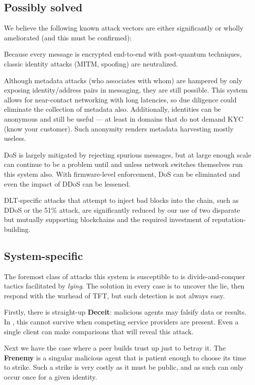 \subsection{Possibly solved}\label{subsec:possibly-solved}

We believe the following known attack vectors are either significantly or wholly ameliorated (and this must be confirmed):

Because every message is encrypted end-to-end with post-quantum techniques, classic identity attacks (MITM, spoofing) are neutralized.

Although metadata attacks (who associates with whom) are hampered by only exposing identity/address pairs in messaging, they are still possible.
This system allows for near-contact networking with long latencies, so due diligence could eliminate the collection of metadata also.
Additionally, identities can be anonymous and still be useful --- at least in domains that do not demand KYC (know your customer).
Such anonymity renders metadata harvesting mostly useless.

DoS is largely mitigated by rejecting spurious messages, but at large enough scale can continue to be a problem until and unless network switches themselves run this system also.
With firmware-level enforcement, DoS can be eliminated and even the impact of DDoS can be lessened.

DLT-specific attacks that attempt to inject bad blocks into the chain, such as DDoS or the 51\% attack, are significantly reduced by our use of two disparate but mutually supporting blockchains and the required investment of reputation-building.


\subsection{System-specific}\label{subsec:system-specific}

The foremost class of attacks this system is susceptible to is divide-and-conquer tactics facilitated by \textit{lying}.
The solution in every case is to uncover the lie, then respond with the warhead of TFT, but such detection is not always easy.

Firstly, there is straight-up \textbf{Deceit}: malicious agents may falsify data or results.
In \projectName, this cannot survive when competing service providers are present.
Even a single client can make comparisons that will reveal this attack.

Next we have the case where a peer builds trust up just to betray it.
The \textbf{Frenemy} is a singular malicious agent that is patient enough to choose its time to strike.
Such a strike is very costly as it must be public, and as such can only occur once for a given identity.

